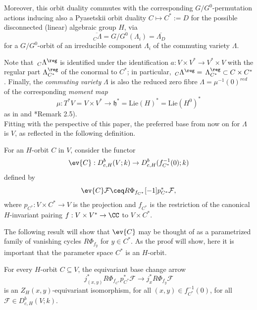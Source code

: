 \documentclass[11pt,letterpaper]{amsart}
\numberwithin{equation}{section}
\begin{document}
Moreover, this orbit duality commutes with the corresponding $G/G^0$-permutation actions inducing also a 
Pyasetskii orbit duality $C\mapsto C^* :=D$ for the possible disconnected (linear) algebraic group $H$, via 
\[
\overline{\,_{C}\Lambda}
=
G/G^0(\Lambda_i)
= 
\overline{\Lambda_{D}}
\]
for a $G/G^0$-orbit of an irreducible component $\Lambda_i$ of the commuting variety $\Lambda$.

Note that $\,_C\Lambda^\reg$ is identified under the identification $a: V\times V^* \to V^* \times V$ with the regular part $\Lambda_{C^*}^\reg$ of the conormal to $C^*$; in particular,  $\,_{C}\Lambda^\reg = \,\Lambda_{C^*}^\reg \subset C\times C^*$. Finally, the {\it commuting variety} $\Lambda$ is also the reduced zero fibre $\Lambda=\mu^{-1}(0)^{red}$
of the corresponding {\it moment map}
\[
\mu  : T^*V = V\times V^* \to \mathfrak{h}^*
=\textrm{Lie}(H)^*=\textrm{Lie}(H^0)^*
\]
as in \cite{Shu25} and \cite{Tev05}*{Remark 2.5}).\\


Fitting with the perspective of this paper, the preferred base from now on for $\Lambda$ is $V$, as reflected in the following definition.
\begin{definition}\label{definition: Appendix ev}  
For an $H$-orbit $C$ in $V$, consider the functor $$\ev{C} : D^b_{c,H}(V;k) \to D^b_{c,H}(f_{C^*}^{-1}(0);k)$$ defined by 
\[
\ev{C}\mathcal{F} \ceq  R\Phi_{f_{C^*}}[-1]p_{C^*}^*\mathcal{F},
\]
where $p_{C^*} : V\times C^* \to V$ is the projection and $f_{C^*}$ is the restriction of the canonical 
$H$-invariant pairing $f: V\times V^* \to \CC$ to $V\times C^*$.
\end{definition}

The following result will show that $\ev{C}$ may be thought of as a parametrized family of vanishing cycles $R\Phi_{f_y}$ for $y\in C^*$.
As the proof will show, here it is important that the parameter space $C^*$ is an $H$-orbit.

\begin{theorem}\label{theorem: family ev}
    For every $H$-orbit $C\subseteq V$, the equivariant base change arrow
    \[
    j_{(x,y)}^* R\Phi_{f_{C^*}} p_{C^*}^*\mathcal{F} \to j_{x}^* R\Phi_{f_y}\mathcal{F}
    \]
    is an $Z_{H}(x,y)$-equivariant isomorphism, for all $(x,y)\in f_{C^*}^{-1}(0)$, for all $\mathcal{F}\in D^b_{c,H}(V;k)$.
\end{theorem}
\end{document}
